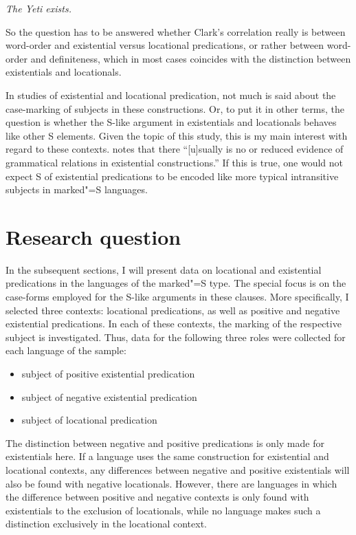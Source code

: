 \begin{exe}\ex\label{Yeti} \textit{The Yeti exists.} \end{exe} 

So the question has to be answered whether Clark's correlation really is between word-order and existential versus locational predications, or rather between word-order and definiteness, which in most cases coincides with the distinction between existentials and locationals.

In studies of existential and locational predication, not much is said about the case-marking of subjects in these constructions. 
Or, to put it in other terms, the question is whether the S-like argument in existentials and locationals behaves like other S elements. 
Given the topic of this study, this is my main interest with regard to these contexts.
\citet[123]{Payne:1997} notes that there ``[u]sually is no or reduced evidence of grammatical relations in existential constructions.''
If this is true, one would not expect S of existential predications to be encoded like more typical intransitive subjects in marked"=S languages.  


\section{Research question}\label{dataexist}

In the subsequent sections, I will present data on locational and existential predications in the languages of the marked"=S type. 
The special focus is on the case-forms employed for the S-like arguments in these clauses. 
More specifically, I selected three contexts: locational predications, as well as positive and negative existential predications. 
In each of these contexts, the marking of the respective subject is investigated. Thus, data for the following three roles were collected for each language of the sample:

\begin{itemize}
\item subject of positive existential predication
\item subject of negative existential predication
\item subject of locational predication
\end{itemize}

The distinction between negative and positive predications is only made for existentials here.
If a language uses the same construction for existential and locational contexts, any differences between negative and positive existentials will also be found with negative locationals. 
However, there are languages in which the difference between positive and negative contexts is only found with existentials to the exclusion of locationals, while no language makes such a distinction exclusively in the locational context. %

